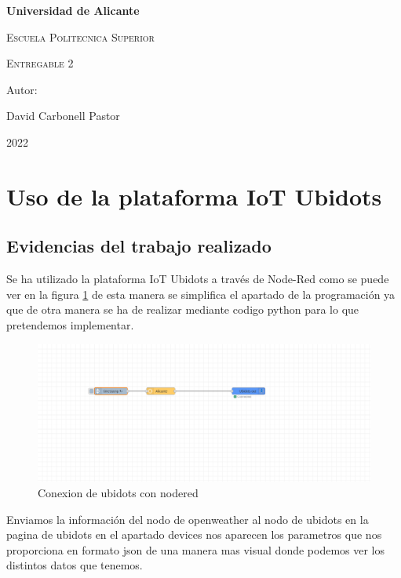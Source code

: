 \documentclass[11pt, letterpaper]{article}
\begin{document}
\begin{titlepage}
	\centering
	{\bfseries\LARGE Universidad de Alicante\par}
	\vspace{1cm}
	{\scshape\Large Escuela Politecnica Superior\par}
	\vspace{3cm}
	{\scshape\Huge Entregable 2\par}
	\vspace{3cm}
	\vfill
	{\Large Autor: \par}
	{\Large David Carbonell Pastor \par}
	\vfill
	{\Large 2022\par}
\end{titlepage}

\tableofcontents

\pagebreak

\section{Uso de la plataforma IoT Ubidots}
\subsection{Evidencias del trabajo realizado}
Se ha utilizado la plataforma IoT Ubidots a través de Node-Red como se puede ver en la figura \ref{fig:ubidots_nodered}
de esta manera se simplifica el apartado de la programación ya que de otra manera se ha de realizar mediante codigo python para
lo que pretendemos implementar.
\begin{figure}[h]
	\centering
	\includegraphics[width=\textwidth]{ubidots_nodered.png}
	\caption{Conexion de ubidots con nodered}
	\label{fig:ubidots_nodered}
\end{figure}

Enviamos la información del nodo de openweather al nodo de ubidots
en la pagina de ubidots en el apartado devices nos aparecen los parametros
que nos proporciona en formato json de una manera mas visual donde podemos ver los
distintos datos que tenemos.\\
\end{document}
